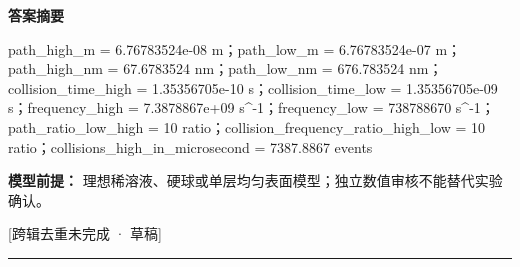 \documentclass[UTF8,11pt,a4paper]{ctexart}
\begin{document}
\noindent\textbf{答案摘要}\par
path\_high\_m = 6.76783524e-08 m；path\_low\_m = 6.76783524e-07 m；path\_high\_nm = 67.6783524 nm；path\_low\_nm = 676.783524 nm；collision\_time\_high = 1.35356705e-10 s；collision\_time\_low = 1.35356705e-09 s；frequency\_high = 7.3878867e+09 s\textasciicircum{}-1；frequency\_low = 738788670 s\textasciicircum{}-1；path\_ratio\_low\_high = 10 ratio；collision\_frequency\_ratio\_high\_low = 10 ratio；collisions\_high\_in\_microsecond = 7387.8867 events\par
\noindent\textbf{模型前提：}
理想稀溶液、硬球或单层均匀表面模型；独立数值审核不能替代实验确认。\par
\noindent\textcolor{red!65!black}{[跨辑去重未完成 · 草稿]} \par
\medskip\hrule\medskip
{}
\end{document}
